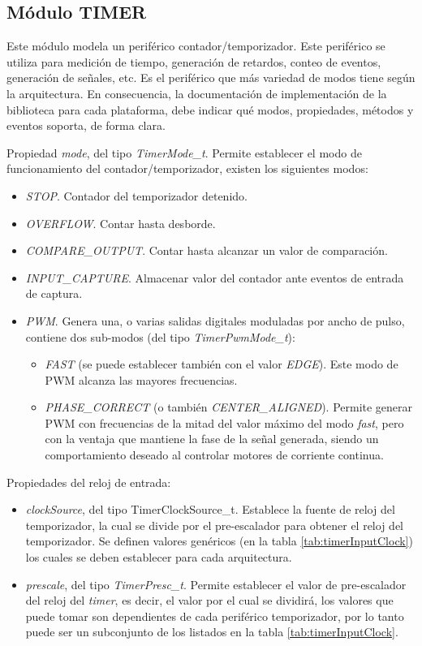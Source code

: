 \subsection{Módulo TIMER}

Este módulo modela un periférico contador/temporizador. Este periférico se utiliza para medición de tiempo, generación de retardos, conteo de eventos, generación de señales, etc. Es el periférico que más variedad de modos tiene según la arquitectura. En consecuencia, la documentación de implementación de la biblioteca para cada plataforma, debe indicar qué modos, propiedades, métodos y eventos soporta, de forma clara.


Propiedad \emph{mode}, del tipo \emph{TimerMode\_t}. Permite establecer el modo de funcionamiento del contador/temporizador, existen los siguientes modos:

\begin{itemize}
\item
\emph{STOP}. Contador del temporizador detenido.
\item
\emph{OVERFLOW}. Contar hasta desborde.
\item
\emph{COMPARE\_OUTPUT}. Contar hasta alcanzar un valor de comparación.
\item
\emph{INPUT\_CAPTURE}. Almacenar valor del contador ante eventos de entrada de captura.
\item
\emph{PWM}. Genera una, o varias salidas digitales moduladas por ancho de pulso, contiene dos sub-modos (del tipo \emph{TimerPwmMode\_t}):
\begin{itemize}
\item
\emph{FAST} (se puede establecer también con el valor \emph{EDGE}). Este modo de PWM alcanza las mayores frecuencias.
\item
\emph{PHASE\_CORRECT} (o también \emph{CENTER\_ALIGNED}). Permite generar PWM con frecuencias de la mitad del valor máximo del modo \emph{fast}, pero con la ventaja que  mantiene la fase de la señal generada, siendo un comportamiento deseado al controlar motores de corriente continua.
\end{itemize}
\end{itemize}

Propiedades del reloj de entrada:

\begin{itemize}
\item
\emph{clockSource}, del tipo {TimerClockSource\_t}. Establece la fuente de reloj del temporizador, la cual se divide por el pre-escalador para obtener el reloj del temporizador. Se definen valores genéricos (en la tabla \ref{tab:timerInputClock}) los cuales se deben establecer para cada arquitectura.
\item
\emph{prescale}, del tipo \emph{TimerPresc\_t}. Permite establecer el valor de pre-escalador del reloj del \emph{timer}, es decir, el valor por el cual se dividirá, los valores que puede tomar son dependientes de cada periférico temporizador, por lo tanto puede ser un subconjunto de los listados en la tabla \ref{tab:timerInputClock}.
\end{itemize}

